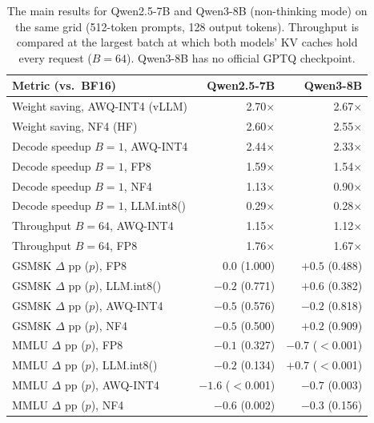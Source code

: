 \begin{table}[htbp]
\centering
\small
\caption{The main results for Qwen2.5-7B and Qwen3-8B (non-thinking mode) on the same grid (512-token prompts, 128 output tokens). Throughput is compared at the largest batch at which both models' KV caches hold every request ($B=64$). Qwen3-8B has no official GPTQ checkpoint.}
\label{tab:general}
\setlength{\tabcolsep}{3.2pt}
\begin{tabular}{lrr}
\toprule
Metric (vs.\ BF16) & Qwen2.5-7B & Qwen3-8B \\
\midrule
Weight saving, AWQ-INT4 (vLLM) & 2.70$\times$ & 2.67$\times$ \\
Weight saving, NF4 (HF) & 2.60$\times$ & 2.55$\times$ \\
Decode speedup $B=1$, AWQ-INT4 & 2.44$\times$ & 2.33$\times$ \\
Decode speedup $B=1$, FP8 & 1.59$\times$ & 1.54$\times$ \\
Decode speedup $B=1$, NF4 & 1.13$\times$ & 0.90$\times$ \\
Decode speedup $B=1$, LLM.int8() & 0.29$\times$ & 0.28$\times$ \\
Throughput $B=64$, AWQ-INT4 & 1.15$\times$ & 1.12$\times$ \\
Throughput $B=64$, FP8 & 1.76$\times$ & 1.67$\times$ \\
GSM8K $\Delta$ pp ($p$), FP8 & $0.0$ (1.000) & $+0.5$ (0.488) \\
GSM8K $\Delta$ pp ($p$), LLM.int8() & $-0.2$ (0.771) & $+0.6$ (0.382) \\
GSM8K $\Delta$ pp ($p$), AWQ-INT4 & $-0.5$ (0.576) & $-0.2$ (0.818) \\
GSM8K $\Delta$ pp ($p$), NF4 & $-0.5$ (0.500) & $+0.2$ (0.909) \\
MMLU $\Delta$ pp ($p$), FP8 & $-0.1$ (0.327) & $-0.7$ ($<$0.001) \\
MMLU $\Delta$ pp ($p$), LLM.int8() & $-0.2$ (0.134) & $+0.7$ ($<$0.001) \\
MMLU $\Delta$ pp ($p$), AWQ-INT4 & $-1.6$ ($<$0.001) & $-0.7$ (0.003) \\
MMLU $\Delta$ pp ($p$), NF4 & $-0.6$ (0.002) & $-0.3$ (0.156) \\
\bottomrule
\end{tabular}
\end{table}
